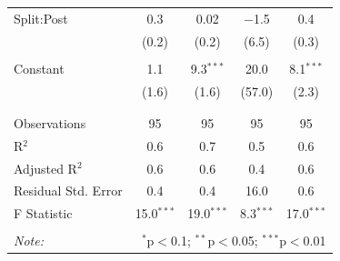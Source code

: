 \documentclass[12pt, a4paper]{article}
\begin{document}
\begin{table}[!htbp]
\begin{tabular}{@{\extracolsep{5pt}}lcccc}
 Split:Post & 0.3 & 0.02 & $-$1.5 & 0.4 \\ 
  & (0.2) & (0.2) & (6.5) & (0.3) \\ 
  & & & & \\ 
 Constant & 1.1 & 9.3$^{***}$ & 20.0 & 8.1$^{***}$ \\ 
  & (1.6) & (1.6) & (57.0) & (2.3) \\ 
  & & & & \\ 
\hline \\[-1.8ex] 
Observations & 95 & 95 & 95 & 95 \\ 
R$^{2}$ & 0.6 & 0.7 & 0.5 & 0.6 \\ 
Adjusted R$^{2}$ & 0.6 & 0.6 & 0.4 & 0.6 \\ 
Residual Std. Error & 0.4 & 0.4 & 16.0 & 0.6 \\ 
F Statistic & 15.0$^{***}$ & 19.0$^{***}$ & 8.3$^{***}$ & 17.0$^{***}$ \\ 
\hline 
\hline \\[-1.8ex] 
\textit{Note:}  & \multicolumn{4}{r}{$^{*}$p$<$0.1; $^{**}$p$<$0.05; $^{***}$p$<$0.01} \\ 
\end{tabular} 
\end{table} %
\end{document}
